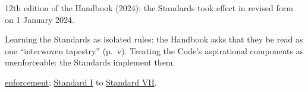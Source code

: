 \begin{qfdefinition}
 12th edition of the Handbook (2024); the Standards took effect in revised form on 1 January 2024.

 Learning the Standards as isolated rules: the Handbook asks that they be read as one ``interwoven tapestry'' (p.~v). Treating the Code's aspirational components as unenforceable: the Standards implement them.

 \hyperref[def:professional-conduct-programme]{enforcement}; \hyperref[rule:standard-professionalism]{Standard I} to \hyperref[rule:standard-member-responsibilities]{Standard VII}.

\end{qfdefinition}
